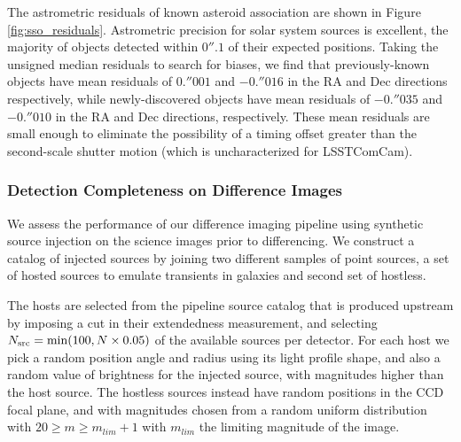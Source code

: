 The astrometric residuals of known asteroid association are shown in Figure \ref{fig:sso_residuals}. 
Astrometric precision for solar system sources is excellent, the majority of objects detected within $0''.1$ of their expected positions. Taking the unsigned median residuals to search for biases, we find that previously-known objects have mean residuals of $0.''001$ and $-0.''016$ in the \gls{RA} and Dec directions respectively, while newly-discovered objects have mean residuals of $-0.''035$ and $-0.''010$ in the \gls{RA} and Dec directions, respectively. These mean residuals are small enough to eliminate the possibility of a timing offset greater than the second-scale shutter motion (which is uncharacterized for LSSTComCam).

\subsubsection{Detection Completeness on Difference Images} \label{sec:perf:dia_completeness}

We assess the performance of our difference imaging \gls{pipeline} using synthetic source injection on the science images prior to differencing.
We construct a catalog of injected sources by joining two different samples of point sources, a set of hosted sources to emulate transients in galaxies and second set of hostless.

The hosts are selected from the \gls{pipeline} source catalog that is produced upstream by imposing a cut in their extendedness measurement, and selecting $N_{\rm src}={\rm min}(100, N\times0.05)$ of the available sources per detector.
%
%
For each host we pick a random position angle and radius using its light profile \gls{shape}, and also a random value of brightness for the injected source, with magnitudes higher than the host source.
The hostless sources instead have random positions in the \gls{CCD} focal plane, and with magnitudes chosen from a random uniform distribution with $20 \geq m \geq m_{lim} + 1$  with $m_{lim}$ the limiting magnitude of the image.

